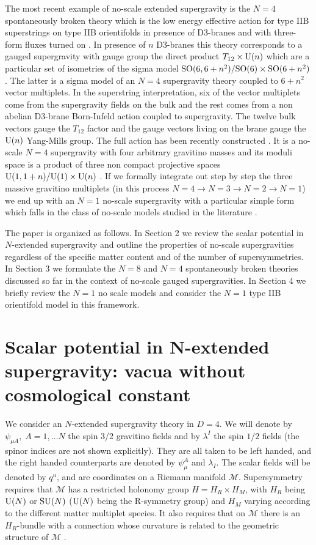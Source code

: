 \documentclass[a4paper,12pt]{article}
\begin{document}
The most recent example of no-scale extended supergravity is the
$N=4$ spontaneously broken theory \cite{adfl3,tz} which is the low
energy effective action for type IIB superstrings on type IIB
orientifolds in presence of D3-branes and with three-form fluxes
turned on \cite{fp}. In presence of $n$ D3-branes  this theory
corresponds to a gauged supergravity with gauge group the direct
product $T_{12}\times \mathrm{U}(n)$ which are a particular set of
isometries of the sigma model
$\mathrm{SO}(6,6+n^2)/\mathrm{SO}(6)\times\mathrm{SO}(6+n^2)$. The latter is a sigma
model of an $N=4$ supergravity theory coupled to $6+n^2$ vector
multiplets. In the superstring interpretation, six of the vector
multiplets come from the supergravity fields on the bulk and the
rest comes from a non abelian D3-brane Born-Infeld action coupled
to supergravity. The twelve bulk vectors gauge the $T_{12}$ factor
and the gauge vectors living on the brane gauge the $\mathrm{U}(n)$
Yang-Mills  group. The full action has been recently constructed
\cite{dfv}. It is a no-scale $N=4$ supergravity with four
arbitrary gravitino masses and its moduli space is a product of
three non compact projective spaces
$\mathrm{U}(1,1+n)/\mathrm{U}(1)\times\mathrm{U}(n)$ \cite{fpo}.  If we formally
integrate out step by step the three massive gravitino multiplets
(in this process $N=4\rightarrow N=3\rightarrow N=2\rightarrow
N=1$) we end up with an $N=1$ no-scale supergravity with a
particular simple form  which falls in the class of no-scale
models studied in the literature \cite{ln}.

 \bigskip

 The paper is organized as follows. In Section 2 we review the scalar potential in
$N$-extended supergravity and outline the properties of no-scale
supergravities regardless of the specific matter content and of
the number of supersymmetries. In Section 3 we formulate the $N=8$
and $N=4$ spontaneously broken theories discussed so far in the
context of no-scale gauged supergravities. In Section 4 we briefly
review the $N=1$ no scale models and consider the $N=1$ type IIB
orientifold model in this framework.

 \section{Scalar potential in N-extended supergravity: vacua without cosmological constant}

 We consider an $N$-extended supergravity theory in $D=4$. We will denote by $\psi_{\mu A}, \;
A=1,\dots N$ the spin 3/2 gravitino fields and by $\lambda^I$ the
spin $1/2$ fields   (the spinor indices are not shown explicitly).
They are all taken to be left handed, and the right handed
counterparts are denoted by $\psi_{\mu }^A$ and $\lambda_I$. The
scalar fields will be denoted by $q^u$, and are coordinates on a
Riemann manifold $\mathcal{M}$. Supersymmetry requires that
$\mathcal{M}$  has a restricted holonomy group $H=H_R\times H_M$,
with $H_R$ being $\mathrm{U}(N)$ or $\mathrm{SU}(N)$ ($\mathrm{U}(N)$ being the
R-symmetry group) and $H_M$ varying according to the different
matter multiplet species. It also requires that on $\mathcal{M}$
there is an $H_R$-bundle with a connection whose curvature  is
related to the geometric structure of  $\mathcal{M}$
\cite{abcdffm}.
\end{document}
